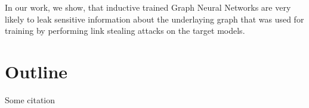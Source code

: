 		In our work, we show, that inductive trained Graph Neural Networks are very likely to leak sensitive information about the underlaying graph that was used for training by performing link stealing attacks on the target models.

	\section{Outline}

Some citation\cite{Anderson:1972}
